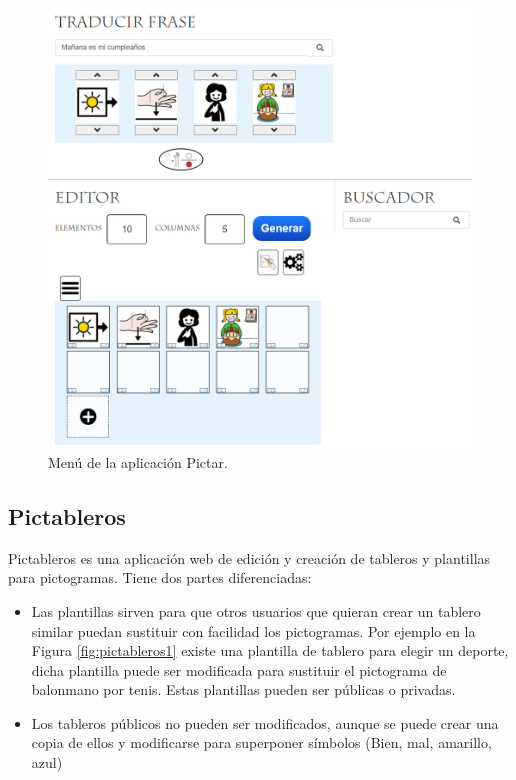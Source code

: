 \begin{figure}[h!]
	\centering
	\includegraphics[width=0.7\linewidth]{Imagenes/Bitmap/Pictar}
	\caption{Menú de la aplicación Pictar.}
	\label{fig:pictar}
\end{figure}

\newpage
\subsection{Pictableros}

Pictableros es una aplicación web de edición y creación de tableros y plantillas para pictogramas. Tiene dos partes diferenciadas:

\begin{itemize}
	\item Las plantillas sirven para que otros usuarios que quieran crear un tablero similar puedan sustituir con facilidad los pictogramas. Por ejemplo en la Figura \ref{fig:pictableros1} existe una plantilla de tablero para elegir un deporte, dicha plantilla puede ser modificada para sustituir el pictograma de balonmano por tenis. Estas plantillas pueden ser públicas o privadas.
	
	\item Los tableros públicos no pueden ser modificados, aunque  se puede crear una copia de ellos y modificarse para superponer símbolos (Bien, mal, amarillo, azul)
	
\end{itemize}
	
